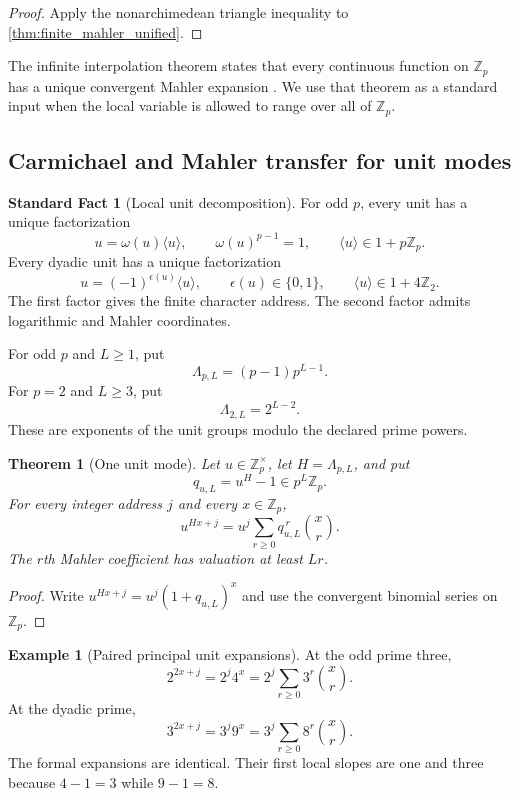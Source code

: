 \documentclass{aomart}
\newtheorem{theorem}{Theorem}[section]
\theoremstyle{definition}
\newtheorem{example}[example]{Example}
\newtheorem{standardfact}[standardfact]{Standard Fact}
\theoremstyle{remark}
\newcommand{\Zp}{\mathbb Z_p}
\begin{document}
\begin{proof}
Apply the nonarchimedean triangle inequality to \cref{thm:finite_mahler_unified}.
\end{proof}

The infinite interpolation theorem states that every continuous function on \(\Zp\) has a unique convergent Mahler expansion \cite{Mahler1958,Robert2000}. We use that theorem as a standard input when the local variable is allowed to range over all of \(\Zp\).

\subsection{Carmichael and Mahler transfer for unit modes}

\begin{standardfact}[Local unit decomposition]\label{fact:local_unit_decomposition}
For odd \(p\), every unit has a unique factorization
\[
u=\omega(u)\langle u\rangle,
\qquad
\omega(u)^{p-1}=1,
\qquad
\langle u\rangle\in1+p\mathbb Z_p.
\]
Every dyadic unit has a unique factorization
\[
u=(-1)^{\epsilon(u)}\langle u\rangle,
\qquad
\epsilon(u)\in\{0,1\},
\qquad
\langle u\rangle\in1+4\mathbb Z_2.
\]
The first factor gives the finite character address. The second factor admits logarithmic and Mahler coordinates.
\end{standardfact}

For odd \(p\) and \(L\geq1\), put
\[
\Lambda_{p,L}=(p-1)p^{L-1}.
\]
For \(p=2\) and \(L\geq3\), put
\[
\Lambda_{2,L}=2^{L-2}.
\]
These are exponents of the unit groups modulo the declared prime powers.

\begin{theorem}[One unit mode]\label{thm:carmichael_mahler_scalar}
Let \(u\in\Zp^\times\), let \(H=\Lambda_{p,L}\), and put
\[
q_{u,L}=u^H-1\in p^L\Zp.
\]
For every integer address \(j\) and every \(x\in\Zp\),
\[
\boxed{
u^{Hx+j}
=
u^j\sum_{r\geq0}q_{u,L}^{\,r}\binom xr.
}
\]
The \(r\)th Mahler coefficient has valuation at least \(Lr\).
\end{theorem}

\begin{proof}
Write \(u^{Hx+j}=u^j(1+q_{u,L})^x\) and use the convergent binomial series on \(\Zp\).
\end{proof}

\begin{example}[Paired principal unit expansions]\label{ex:paired_unit_expansions}
At the odd prime three,
\[
2^{2x+j}
=
2^j4^x
=
2^j\sum_{r\geq0}3^r\binom xr.
\]
At the dyadic prime,
\[
3^{2x+j}
=
3^j9^x
=
3^j\sum_{r\geq0}8^r\binom xr.
\]
The formal expansions are identical. Their first local slopes are one and three because \(4-1=3\) while \(9-1=8\).
\end{example}
\end{document}

